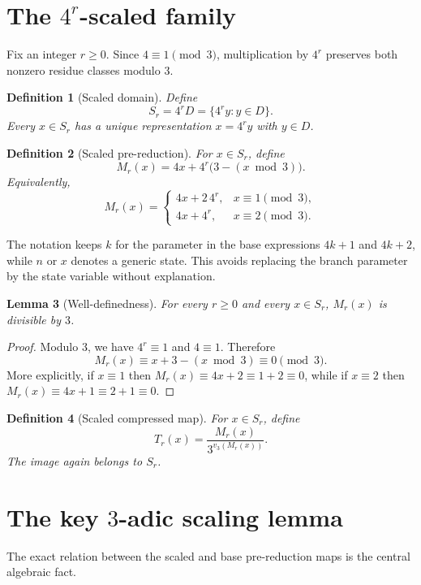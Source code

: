 \documentclass[11pt]{article}
\newtheorem{definition}{Definition}[section]
\newtheorem{lemma}[definition]{Lemma}
\begin{document}
\section{The $4^r$-scaled family}
Fix an integer $r\ge0$. Since $4\equiv1\pmod3$, multiplication by $4^r$ preserves both nonzero residue classes modulo $3$.

\begin{definition}[Scaled domain]
Define
\[
S_r=4^rD=\{4^ry:y\in D\}.
\]
Every $x\in S_r$ has a unique representation $x=4^ry$ with $y\in D$.
\end{definition}

\begin{definition}[Scaled pre-reduction]
For $x\in S_r$, define
\[
M_r(x)=4x+4^r\bigl(3-(x\bmod3)\bigr).
\]
Equivalently,
\[
M_r(x)=
\begin{cases}
4x+2\,4^r,&x\equiv1\pmod3,\\
4x+4^r,&x\equiv2\pmod3.
\end{cases}
\]
\end{definition}

The notation keeps $k$ for the parameter in the base expressions $4k+1$ and $4k+2$, while $n$ or $x$ denotes a generic state. This avoids replacing the branch parameter by the state variable without explanation.

\begin{lemma}[Well-definedness]
For every $r\ge0$ and every $x\in S_r$, $M_r(x)$ is divisible by $3$.
\end{lemma}
\begin{proof}
Modulo $3$, we have $4^r\equiv1$ and $4\equiv1$. Therefore
\[
M_r(x)\equiv x+3-(x\bmod3)\equiv0\pmod3.
\]
More explicitly, if $x\equiv1$ then $M_r(x)\equiv4x+2\equiv1+2\equiv0$, while if $x\equiv2$ then $M_r(x)\equiv4x+1\equiv2+1\equiv0$.
\end{proof}

\begin{definition}[Scaled compressed map]
For $x\in S_r$, define
\[
T_r(x)=\frac{M_r(x)}{3^{v_3(M_r(x))}}.
\]
The image again belongs to $S_r$.
\end{definition}

\section{The key $3$-adic scaling lemma}
The exact relation between the scaled and base pre-reduction maps is the central algebraic fact.
\end{document}
